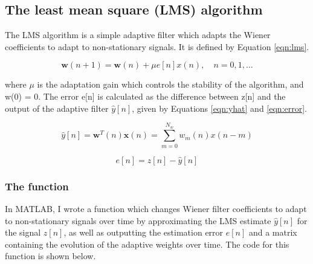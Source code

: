 \subsection{The least mean square (LMS) algorithm}

The LMS algorithm is a simple adaptive filter which adapts the Wiener coefficients to adapt to non-stationary signals. It is defined by Equation \ref{eqn:lms}.

\begin{equation}
\boldsymbol{w}(n+1)=\boldsymbol{w}(n)+\mu e[n] x(n), \quad n=0,1, \ldots
\label{eqn:lms}
\end{equation}

\noindent
where $\mu$ is the adaptation gain which controls the stability of the algorithm, and w(0) = 0. The error e[n] is calculated as the difference between z[n] and the output of the adaptive filter $\hat{y}[n]$, given by Equations \ref{eqn:yhat} and \ref{eqn:error}.

\begin{equation}
\hat{y}[n]=\mathbf{w}^{T}(n) \mathbf{x}(n)=\sum_{m=0}^{N_{w}} w_{m}(n) x(n-m)
\label{eqn:yhat}
\end{equation}

\begin{equation}
e[n]=z[n]-\hat{y}[n]
\label{eqn:error}
\end{equation}

\subsubsection{The  function}

In MATLAB, I wrote a function  which changes Wiener filter coefficients to adapt to non-stationary signals over time by approximating the LMS estimate $\hat{y}[n]$ for the signal $z[n]$, as well as outputting the estimation error $e[n]$ and a matrix containing the evolution of the adaptive weights over time. The code for this function is shown below.

\vspace{0.2cm}

